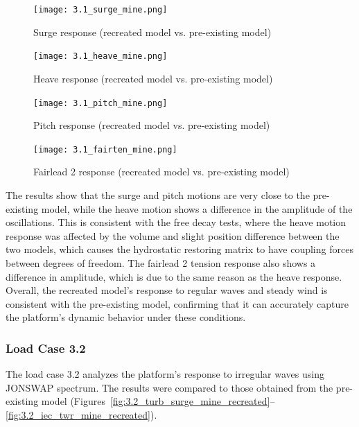 \documentclass[a4paper, 11pt]{article}
\begin{document}
\begin{figure}[H]
    \begin{minipage}{0.48\textwidth}
        \centering
        \texttt{[image: 3.1\_surge\_mine.png]}
        \caption{\small Surge response (recreated model vs. pre-existing model)}
        \label{fig:3.1_surge_mine_recreated}
    \end{minipage}
    \hfill
    \begin{minipage}{0.5\textwidth}
        \centering
        \texttt{[image: 3.1\_heave\_mine.png]}
        \caption{\small Heave response (recreated model vs. pre-existing model)}
        \label{fig:3.1_heave_mine_recreated}
    \end{minipage}
\end{figure}

\begin{figure}[H]
    \begin{minipage}{0.48\textwidth}
        \centering
        \texttt{[image: 3.1\_pitch\_mine.png]}
        \caption{\small Pitch response (recreated model vs. pre-existing model)}
        \label{fig:3.1_pitch_mine_recreated}
    \end{minipage}
    \hfill
    \begin{minipage}{0.5\textwidth}
        \centering
        \texttt{[image: 3.1\_fairten\_mine.png]}
        \caption{\small Fairlead 2 response (recreated model vs. pre-existing model)}
        \label{fig:3.1_fairten_mine_recreated}
    \end{minipage}
\end{figure}

The results show that the surge and pitch motions are very close to the pre-existing model, while the heave motion shows a difference in the amplitude of the oscillations. This is consistent with the free decay tests, where the heave motion response was affected by the volume and slight position difference between the two models, which causes the hydrostatic restoring matrix to have coupling forces between degrees of freedom. The fairlead 2 tension response also shows a difference in amplitude, which is due to the same reason as the heave response. Overall, the recreated model's response to regular waves and steady wind is consistent with the pre-existing model, confirming that it can accurately capture the platform's dynamic behavior under these conditions.

\subsubsection{Load Case 3.2}
\hspace*{0.5cm}The load case 3.2 analyzes the platform's response to irregular waves using JONSWAP spectrum. The results were compared to those obtained from the pre-existing model (Figures~\ref{fig:3.2_turb_surge_mine_recreated}--\ref{fig:3.2_iec_twr_mine_recreated}).
\end{document}
